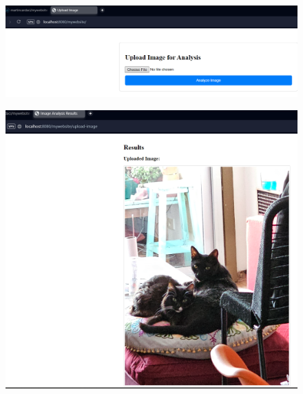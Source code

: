 \documentclass[sigconf]{acmart}
\begin{document}
\begin{figure}[H]
    \centering
    \includegraphics[width=1\linewidth]{web1.png}
    \caption{}
    \label{fig:enter-label}
\end{figure}

\begin{figure}[H]
    \centering
    \includegraphics[width=1\linewidth]{web2.png}
    \caption{}
    \label{fig:enter-label}
\end{figure}
\end{document}
